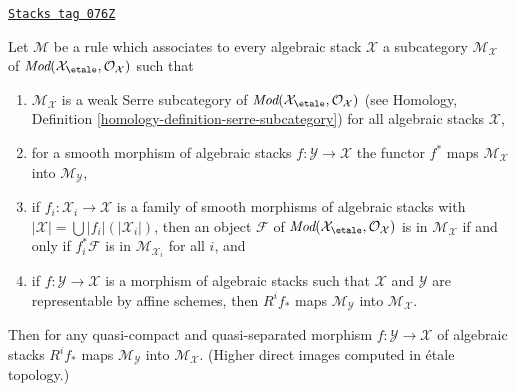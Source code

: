 \begin{lemma}
\label{stacks-cohomology-lemma-general-pushforward}
\href{https://stacks.math.columbia.edu/tag/076Z}{\texttt{Stacks tag 076Z}}

Let $\mathcal{M}$ be a rule which associates to every algebraic stack
$\mathcal{X}$ a subcategory $\mathcal{M}_\mathcal{X}$ of
$\textit{Mod}(\mathcal{X}_\etale, \mathcal{O}_\mathcal{X})$
such that
\begin{enumerate}
\item $\mathcal{M}_\mathcal{X}$ is a weak Serre subcategory
of $\textit{Mod}(\mathcal{X}_\etale, \mathcal{O}_\mathcal{X})$
(see Homology, Definition \ref{homology-definition-serre-subcategory})
for all algebraic stacks $\mathcal{X}$,
\item for a smooth morphism of algebraic stacks
$f : \mathcal{Y} \to \mathcal{X}$ the functor $f^*$ maps
$\mathcal{M}_\mathcal{X}$ into $\mathcal{M}_\mathcal{Y}$,
\item if $f_i : \mathcal{X}_i \to \mathcal{X}$ is a family of smooth
morphisms of algebraic stacks with
$|\mathcal{X}| = \bigcup |f_i|(|\mathcal{X}_i|)$, then an object
$\mathcal{F}$ of
$\textit{Mod}(\mathcal{X}_\etale, \mathcal{O}_\mathcal{X})$
is in $\mathcal{M}_\mathcal{X}$ if and only if
$f_i^*\mathcal{F}$ is in $\mathcal{M}_{\mathcal{X}_i}$ for all $i$, and
\item if $f : \mathcal{Y} \to \mathcal{X}$ is a morphism of algebraic
stacks such that $\mathcal{X}$ and $\mathcal{Y}$ are representable
by affine schemes, then $R^if_*$ maps $\mathcal{M}_\mathcal{Y}$
into $\mathcal{M}_\mathcal{X}$.
\end{enumerate}
Then for any quasi-compact and quasi-separated morphism
$f : \mathcal{Y} \to \mathcal{X}$ of algebraic stacks
$R^if_*$ maps $\mathcal{M}_\mathcal{Y}$
into $\mathcal{M}_\mathcal{X}$. (Higher direct images computed in \'etale
topology.)
\end{lemma}

